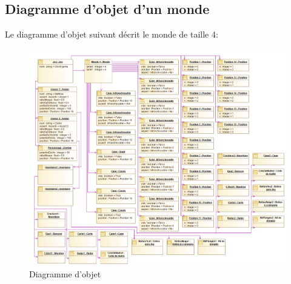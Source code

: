 
\subsection{Diagramme d'objet d'un monde}
\label{sec:question-6}

Le diagramme d'objet suivant décrit le monde de taille 4:

\begin{figure}
	\centering
	\includegraphics[width=\textwidth]{assets/Diagramme_objet}
	\caption{Diagramme d'objet}
	\label{fig:diagrammeobjet}
\end{figure}